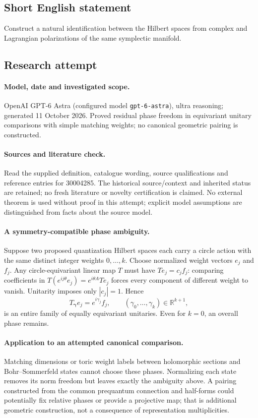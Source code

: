 \documentclass[11pt]{article}
\begin{document}
\subsection{Short English statement}
Construct a natural identification between the Hilbert spaces from complex and Lagrangian polarizations of the same symplectic manifold.
\subsection{Research attempt}
\paragraph{Model, date and investigated scope.}
OpenAI GPT-6 Astra (configured model \texttt{gpt-6-astra}), ultra reasoning; generated 11 October 2026. Proved residual phase freedom in equivariant unitary comparisons with simple matching weights; no canonical geometric pairing is constructed.

\paragraph{Sources and literature check.}
Read the supplied definition, catalogue wording, source qualifications and reference entries for 30004285. The historical source/context and inherited status are retained; no fresh literature or novelty certification is claimed. No external theorem is used without proof in this attempt; explicit model assumptions are distinguished from facts about the source model.

\paragraph{A symmetry-compatible phase ambiguity.} Suppose two proposed quantization Hilbert spaces each carry a circle action with the same distinct integer weights \(0,\ldots,k\). Choose normalized weight vectors \(e_j\) and \(f_j\). Any circle-equivariant linear map \(T\) must have \(Te_j=c_jf_j\): comparing coefficients in \(T(e^{ij\theta}e_j)=e^{i\theta A}Te_j\) forces every component of different weight to vanish. Unitarity imposes only \(|c_j|=1\). Hence
\[
 T_{\boldsymbol\gamma}e_j=e^{i\gamma_j}f_j,\qquad
 (\gamma_0,\ldots,\gamma_k)\in\mathbb R^{k+1},
\]
is an entire family of equally equivariant unitaries. Even for \(k=0\), an overall phase remains.
\paragraph{Application to an attempted canonical comparison.} Matching dimensions or toric weight labels between holomorphic sections and Bohr--Sommerfeld states cannot choose these phases. Normalizing each state removes its norm freedom but leaves exactly the ambiguity above. A pairing constructed from the common prequantum connection and half-forms could potentially fix relative phases or provide a projective map; that is additional geometric construction, not a consequence of representation multiplicities.
\end{document}
